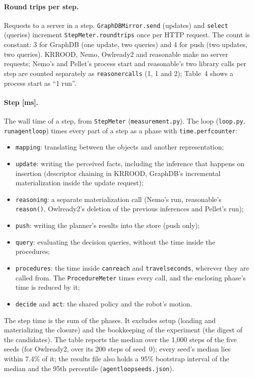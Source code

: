 \documentclass[10pt]{article}
\newcommand{\brkunderscore}{\textunderscore\allowbreak}
\newcommand{\code}[1]{{\let\_\brkunderscore\texttt{#1}}}
\newcommand{\file}[1]{{\let\_\brkunderscore\texttt{#1}}}
\begin{document}
\paragraph{Round trips per step.} Requests to a server in a step. \code{GraphDBMirror.\_send} (updates) and
\code{\_select} (queries) increment \code{StepMeter.round\_trips} once per HTTP request. The count is constant: 3 for
GraphDB (one update, two queries) and 4 for push (two updates, two queries). KRROOD, Nemo, Owlready2 and reasonable make no server
requests; Nemo's and Pellet's process start and reasonable's two library calls per step are counted separately as
\code{reasoner\_calls} (1, 1 and 2); Table~4 shows a process start as ``1 run''.

\paragraph{Step [ms].} The wall time of a step, from \code{StepMeter} (\file{measurement.py}). The loop
(\file{loop.py}, \code{run\_agent\_loop}) times every part of a step as a phase with \code{time.perf\_counter}:
\begin{itemize}
  \item \code{mapping}: translating between the objects and another representation;
  \item \code{update}: writing the perceived facts, including the inference that happens on insertion (descriptor
        chaining in KRROOD, GraphDB's incremental materialization inside the update request);
  \item \code{reasoning}: a separate materialization call (Nemo's run, reasonable's \code{reason()}, Owlready2's deletion
        of the previous inferences and Pellet's run);
  \item \code{push}: writing the planner's results into the store (push only);
  \item \code{query}: evaluating the decision queries, without the time inside the procedures;
  \item \code{procedures}: the time inside \code{can\_reach} and \code{travel\_seconds}, wherever they are called
        from. The \code{ProcedureMeter} times every call, and the enclosing phase's time is reduced by it;
  \item \code{decide} and \code{act}: the shared policy and the robot's motion.
\end{itemize}
The step time is the sum of the phases. It excludes setup (loading and materializing the closure) and the bookkeeping of
the experiment (the digest of the candidates). The table reports the median over the 1,000 steps of the five seeds (for Owlready2, over its 200 steps of seed~0);
every seed's median lies within 7.4\% of it; the results file also holds a 95\% bootstrap interval of the
median and the 95th percentile (\file{agent\_loop\_seeds.json}).
\end{document}
